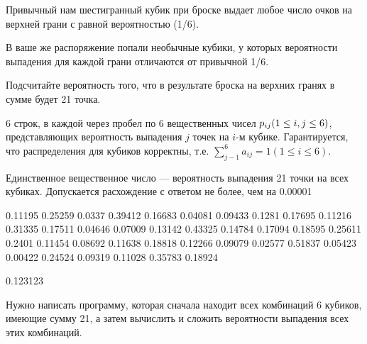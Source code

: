 
Привычный нам шестигранный кубик при броске выдает любое число очков на верхней грани с равной вероятностью (1/6).

В ваше же распоряжение попали необычные кубики, у которых вероятности выпадения для каждой грани отличаются от привычной 1/6.

Подсчитайте вероятность того, что в результате броска на верхних гранях в сумме будет 21 точка.


6 строк, в каждой через пробел по 6 вещественных чисел $p_{ij}\space(1\leq i, j\leq 6)$, представляющих вероятность выпадения $j$ точек на $i$-м кубике. Гарантируется, что распределения для кубиков корректны, т.е. $\sum_{j-1}^6 a_{ij} = 1 (1\leq i\leq 6) $.

\outputfmtSection

Единственное вещественное число — вероятность выпадения 21 точки на всех кубиках. Допускается расхождение с ответом не более, чем на 0.00001\markSection


\begin{myverbbox}[\small]{\vinput}
    0.11195 0.25259 0.0337 0.39412 0.16683 0.04081
    0.09433 0.1281 0.17695 0.11216 0.31335 0.17511
    0.04646 0.07009 0.13142 0.43325 0.14784 0.17094
    0.18595 0.25611 0.2401 0.11454 0.08692 0.11638
    0.18818 0.12266 0.09079 0.02577 0.51837 0.05423
    0.00422 0.24524 0.09319 0.11028 0.35783 0.18924
\end{myverbbox}
\begin{myverbbox}[\small]{\voutput}
    0.123123
\end{myverbbox}

\solutionSection

Нужно написать программу, которая сначала находит всех комбинаций 6 кубиков, имеющие сумму 21, а затем вычислить и сложить вероятности выпадения всех этих комбинаций.

